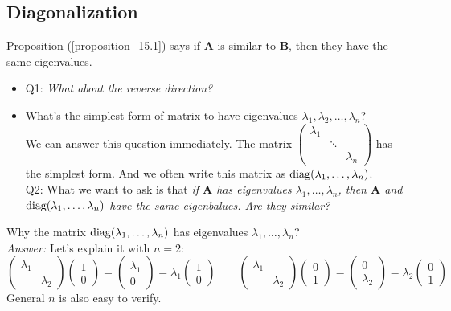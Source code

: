 \subsection{Diagonalization}
Proposition (\ref{proposition_15.1}) says if $\bm A$ is similar to $
\bm B$, then they have the same eigenvalues.
\begin{itemize}
\item
Q1:
\textit{What about the reverse direction?}
\item
What's the simplest form of matrix to have eigenvalues $\lambda_1,\lambda_2,\dots,\lambda_n$?\\ We can answer this question immediately. The matrix $\begin{pmatrix}
\lambda_1&&\\&\ddots&\\&&\lambda_n
\end{pmatrix}$ has the simplest form. And we often write this matrix as $\operatorname{diag}(\lambda_1,\dots,\lambda_n)$.\\
Q2: What we want to ask is that \textit{if $\bm A$ has eigenvalues $\lambda_1,\dots,\lambda_n$, then $\bm A$ and $\operatorname{diag}(\lambda_1,\dots,\lambda_n)$ have the same eigenbalues. Are they similar?}
\end{itemize}
\begin{remark}
Why the matrix $\operatorname{diag}(\lambda_1,\dots,\lambda_n)$ has eigenvalues $\lambda_1,\dots,\lambda_n$?\\
\textit{Answer: }Let's explain it with $n=2:$
\[
\begin{pmatrix}
\lambda_1&\\&\lambda_2
\end{pmatrix}\begin{pmatrix}
1\\0
\end{pmatrix}=\begin{pmatrix}
\lambda_1\\0
\end{pmatrix}=\lambda_1\begin{pmatrix}
1\\0
\end{pmatrix}\qquad
\begin{pmatrix}
\lambda_1&\\&\lambda_2
\end{pmatrix}\begin{pmatrix}
0\\1
\end{pmatrix}=\begin{pmatrix}
0\\\lambda_2
\end{pmatrix}=\lambda_2\begin{pmatrix}
0\\1
\end{pmatrix}
\]
General $n$ is also easy to verify.
\end{remark}
